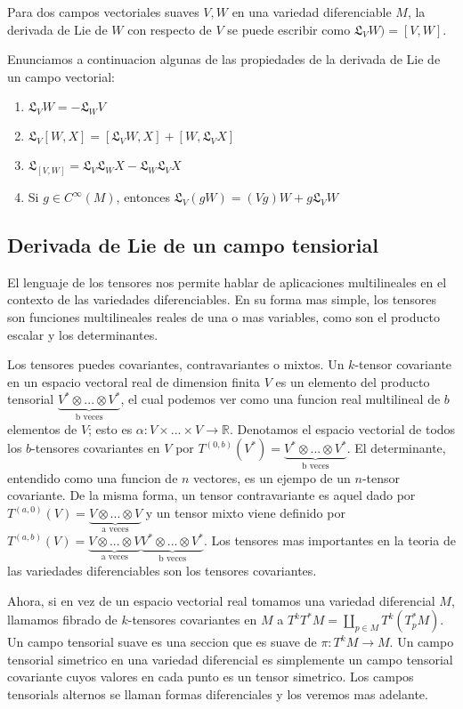\documentclass[12pt]{extarticle}
\newcommand{\R}{\mathbb{R}}
\newcommand{\<}{\langle}
\renewcommand{\>}{\rangle}
\theoremstyle{definition}
\begin{document}
Para dos campos vectoriales suaves $V, W$ en una variedad diferenciable $M$, la
derivada de Lie de $W$ con respecto de $V$ se puede escribir como
$\mathfrak{L}_VW) = [V, W]$.

Enunciamos a continuacion algunas de las propiedades de la derivada de Lie de un
campo vectorial:

\begin{enumerate}
  \item $\mathfrak{L}_VW = - \mathfrak{L}_WV$
  \item $\mathfrak{L}_V[W, X] = [\mathfrak{L}_VW, X] + [W, \mathfrak{L}_VX]$
  \item $\mathfrak{L}_{[V, W]} = \mathfrak{L}_V \mathfrak{L}_W X -
  \mathfrak{L}_W \mathfrak{L}_V X $
  \item Si $g \in C^{\infty}(M)$, entonces $\mathfrak{L}_V(gW) = (Vg)W +
  g\mathfrak{L}_VW$
\end{enumerate}

\subsection{Derivada de Lie de un campo tensiorial}
El lenguaje de los tensores nos permite hablar de aplicaciones multilineales en
el contexto de las variedades diferenciables. En su forma mas simple, los
tensores son funciones multilineales reales de una o mas variables, como son el
producto escalar y los determinantes.

Los tensores puedes covariantes, contravariantes o mixtos. Un $k$-tensor
covariante en un espacio vectoral real de dimension finita $V$
es un elemento del producto tensorial $\underbrace{V^*\otimes...\otimes V^*}_{\text{b veces}}$, el cual
podemos ver como una funcion real multilineal de $b$ elementos de $V$; esto es
$\alpha : V \times ... \times V \rightarrow \R$. Denotamos el espacio vectorial
de todos los $b$-tensores covariantes en $V$ por
$T^{(0,b)}(V^*)=\underbrace{V^*\otimes...\otimes V^*}_{\text{b veces}}$. El
determinante, entendido como una funcion de $n$ vectores, es un ejempo de un
$n$-tensor covariante. De la misma forma, un tensor contravariante es aquel dado
por $T^{(a,0)}(V) = \underbrace{V\otimes...\otimes V}_{\text{a veces}}$ y un
tensor mixto viene definido por $T^{(a,b)}(V) = \underbrace{V\otimes...\otimes
V}_{\text{a veces}} \underbrace{V^*\otimes...\otimes V^*}_{\text{b veces}}$. Los
tensores mas importantes en la teoria de las variedades diferenciables son los
tensores covariantes.


Ahora, si en vez de un espacio vectorial real tomamos una variedad diferencial $M$,
llamamos fibrado de $k$-tensores covariantes en $M$ a $T^kT^*M = \coprod_{p \in
M}T^k(T_p^*M)$. Un campo tensorial suave es una seccion que es suave de $\pi :
T^kM \rightarrow M$. Un campo tensorial simetrico en una variedad diferencial es
simplemente un campo tensorial covariante cuyos valores en cada punto es un
tensor simetrico. Los campos tensorials alternos se llaman formas diferenciales
y los veremos mas adelante.
\end{document}
